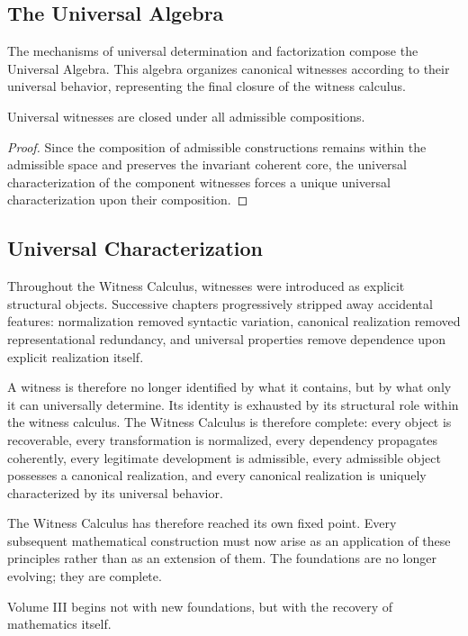 \documentclass[12pt,anyside]{book}
\begin{document}
\subsection{The Universal Algebra}
The mechanisms of universal determination and factorization compose the Universal Algebra. This algebra organizes canonical witnesses according to their universal behavior, representing the final closure of the witness calculus.

\begin{theorem}
Universal witnesses are closed under all admissible compositions.
\end{theorem}
\begin{proof}
Since the composition of admissible constructions remains within the admissible space and preserves the invariant coherent core, the universal characterization of the component witnesses forces a unique universal characterization upon their composition.
\end{proof}

\subsection{Universal Characterization}
Throughout the Witness Calculus, witnesses were introduced as explicit structural objects. Successive chapters progressively stripped away accidental features: normalization removed syntactic variation, canonical realization removed representational redundancy, and universal properties remove dependence upon explicit realization itself.

A witness is therefore no longer identified by what it contains, but by what only it can universally determine. Its identity is exhausted by its structural role within the witness calculus. The Witness Calculus is therefore complete: every object is recoverable, every transformation is normalized, every dependency propagates coherently, every legitimate development is admissible, every admissible object possesses a canonical realization, and every canonical realization is uniquely characterized by its universal behavior.

The Witness Calculus has therefore reached its own fixed point. Every subsequent mathematical construction must now arise as an application of these principles rather than as an extension of them. The foundations are no longer evolving; they are complete.

Volume III begins not with new foundations, but with the recovery of mathematics itself.
\end{document}
